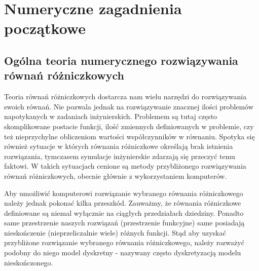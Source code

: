 \documentclass[12pt,a4paper]{report}
\begin{document}

\chapter{Numeryczne zagadnienia początkowe}

\section{Ogólna teoria numerycznego rozwiązywania równań różniczkowych}

Teoria równań różniczkowych dostarcza nam wielu narzędzi do rozwiązywania swoich równań. Nie pozwala jednak na rozwiązywanie znacznej ilości problemów napotykanych w zadaniach inżynierskich. Problemem są tutaj często skomplikowane postacie funkcji, ilość zmiennych definiowanych w problemie, czy też nieprzychylne obliczeniom wartości współczynników w równaniu. Spotyka się również sytuacje w których równania różniczkowe określają brak istnienia rozwiązania, tymczasem symulacje inżynierskie zdarzają się przeczyć temu faktowi. W takich sytuacjach cenione są metody przybliżonego rozwiązywania równań różniczkowych, obecnie głównie z wykorzystaniem komputerów. 

Aby umożliwić komputerowi rozwiązanie wybranego równania różniczkowego należy jednak pokonać kilka przeszkód. Zauważmy, że równania różniczkowe definiowane są niemal wyłącznie na ciągłych przedziałach dziedziny. Ponadto same przestrzenie naszych rozwiązań (przestrzenie funkcyjne) same posiadają nieskończenie (nieprzeliczalnie wiele) różnych funkcji. Stąd aby uzyskać przybliżone rozwiązanie wybranego równania różniczkowego, należy rozważyć podobny do niego model dyskretny - nazywany często dyskretyzacją modelu nieskończonego. 
\end{document}
